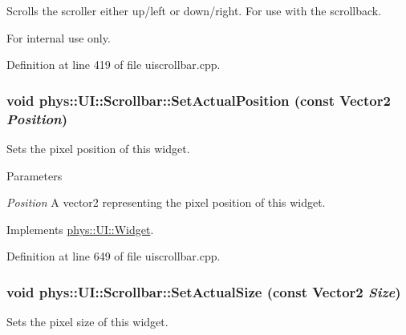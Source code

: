 Scrolls the scroller either up/left or down/right. For use with the scrollback. 

\begin{DoxyInternal}{For internal use only.}
\end{DoxyInternal}


Definition at line 419 of file uiscrollbar.cpp.

\hypertarget{classphys_1_1UI_1_1Scrollbar_a6070857488f05d0349b48f249edf813f}{
\subsubsection[{SetActualPosition}]{\setlength{\rightskip}{0pt plus 5cm}void phys::UI::Scrollbar::SetActualPosition (const {\bf Vector2} {\em Position})}}
\label{d0/d3e/classphys_1_1UI_1_1Scrollbar_a6070857488f05d0349b48f249edf813f}


Sets the pixel position of this widget. 


\begin{DoxyParams}{Parameters}
\item[{\em Position}]A vector2 representing the pixel position of this widget. \end{DoxyParams}


Implements \hyperlink{classphys_1_1UI_1_1Widget_acba334c000c21f477238e961cd3ab2ce}{phys::UI::Widget}.



Definition at line 649 of file uiscrollbar.cpp.

\hypertarget{classphys_1_1UI_1_1Scrollbar_ae21108cb65871ba59da2984542eab1a1}{
\subsubsection[{SetActualSize}]{\setlength{\rightskip}{0pt plus 5cm}void phys::UI::Scrollbar::SetActualSize (const {\bf Vector2} {\em Size})}}
\label{d0/d3e/classphys_1_1UI_1_1Scrollbar_ae21108cb65871ba59da2984542eab1a1}


Sets the pixel size of this widget. 



